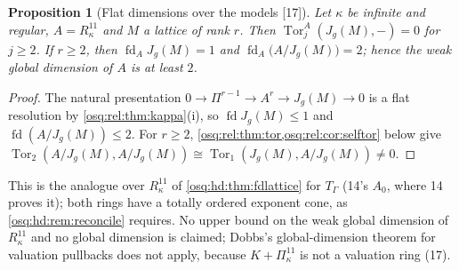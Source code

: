\documentclass[11pt,letterpaper]{article}
\numberwithin{equation}{section}
\newtheorem{proposition}[proposition]{Proposition}
\theoremstyle{definition}
\theoremstyle{remark}
\theoremstyle{plain}
\newcommand{\Tor}{\operatorname{Tor}}
\newcommand{\fd}{\operatorname{fd}}
\newcommand{\src}[1]{\textup{\textsf{[#1]}}}
\begin{document}
\begin{proposition}[Flat dimensions over the models \src{17}]\label{osq:rel:prop:fd}
Let $\kappa$ be infinite and regular, $A=R^{11}_\kappa$ and $M$ a lattice of rank $r$. Then $\Tor^A_j(J_g(M),-)=0$ for $j\ge2$. If
$r\ge2$, then $\fd_AJ_g(M)=1$ and $\fd_A\bigl(A/J_g(M)\bigr)=2$; hence the weak global dimension of $A$ is at least $2$.
\end{proposition}
\begin{proof}
The natural presentation $0\to\Pi^{r-1}\to A^r\to J_g(M)\to0$ is a flat resolution by \cref{osq:rel:thm:kappa}(i), so
$\fd J_g(M)\le1$ and $\fd(A/J_g(M))\le2$. For $r\ge2$, \cref{osq:rel:thm:tor,osq:rel:cor:selftor} below give
$\Tor_2(A/J_g(M),A/J_g(M))\cong\Tor_1(J_g(M),A/J_g(M))\ne0$.
\end{proof}

This is the analogue over $R^{11}_\kappa$ of \cref{osq:hd:thm:fdlattice} for $T_\Gamma$ (14's $A_0$, where 14 proves it); both rings have
a totally ordered exponent cone, as \cref{osq:hd:rem:reconcile} requires. No upper bound on the weak global dimension of $R^{11}_\kappa$
and no global dimension is claimed; Dobbs's global-dimension theorem for valuation pullbacks does not apply, because
$K+\Pi^{11}_\kappa$ is not a valuation ring (17).
\end{document}
